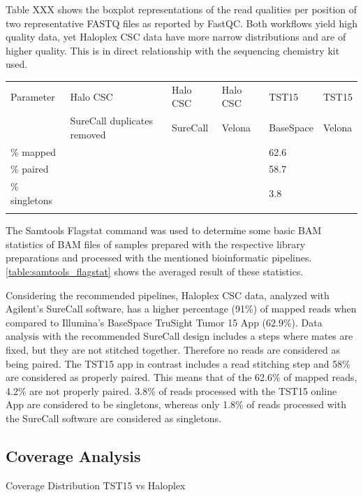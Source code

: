Table XXX shows the boxplot representations of the read qualities per position
of two representative FASTQ files as reported by FastQC. Both workflows yield high
quality data, yet Haloplex CSC data have more narrow distributions and are of higher
quality. This is in direct relationship with the sequencing chemistry kit used.

\begin{table}
\begin{tabular}{p{3.5cm} p{1cm} p{1cm}}\\
\hline
Parameter & Halo CSC & Halo CSC & Halo CSC & TST15 & TST15 \\
          & SureCall duplicates removed & SureCall & Velona & BaseSpace & Velona \\
\hline
\% mapped & & & & 62.6 & \\
\% paired & & & & 58.7 & \\
\% singletons & & & & 3.8 & \\
\label{samtools_flagstat}
\end{tabular}
\end{table}

The Samtools Flagstat command was used to determine some basic BAM statistics of
BAM files of samples prepared with the respective library preparations and
processed with the mentioned bioinformatic pipelines.
\ref{table:samtools_flagstat} shows the averaged result of these statistics.

Considering the recommended pipelines, Haloplex CSC data, analyzed with
Agilent's SureCall software, has a higher percentage (91\%) of mapped reads when
compared to Illumina's BaseSpace TruSight Tumor 15 App (62.9\%). Data analysis
with the recommended SureCall design includes a steps where mates are fixed, but
they are not stitched together. Therefore no reads are considered as being
paired. The TST15 app in contrast includes a read stitching step and 58\% are
considered as properly paired. This means that of the 62.6\% of mapped reads,
4.2\% are not properly paired. 3.8\% of reads processed with the TST15 online
App are considered to be singletons, whereas only 1.8\% of reads processed with
the SureCall software are considered as singletons.

\subsection{Coverage Analysis}

Coverage Distribution TST15 vs Haloplex


